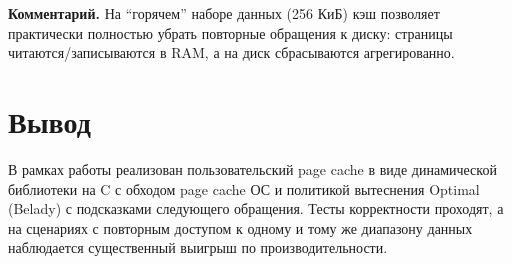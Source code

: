 \documentclass[12pt,a4paper]{article}
\begin{document}
\textbf{Комментарий.} На ``горячем'' наборе данных (256 КиБ) кэш позволяет практически полностью убрать повторные обращения к диску: страницы читаются/записываются в RAM, а на диск сбрасываются агрегированно.

\section{Вывод}
В рамках работы реализован пользовательский page cache в виде динамической библиотеки на C с обходом page cache ОС и политикой вытеснения Optimal (Belady) с подсказками следующего обращения.
Тесты корректности проходят, а на сценариях с повторным доступом к одному и тому же диапазону данных наблюдается существенный выигрыш по производительности.
\end{document}
